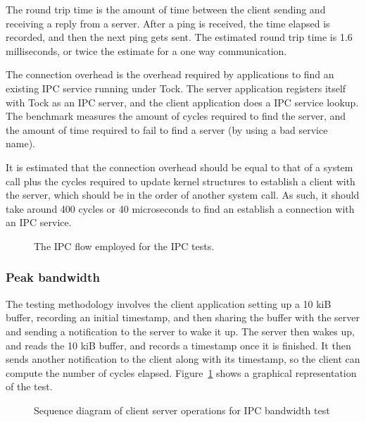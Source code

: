 \documentclass{article}
\begin{document}
The round trip time is the amount of time between the client sending and receiving a reply from a server. After a ping is received, the time elapsed is recorded, and then the next ping gets sent. The estimated round trip time is 1.6 milliseconds, or twice the estimate for a one way communication.

The connection overhead is the overhead required by applications to find an existing IPC service running under Tock. The server application registers itself with Tock as an IPC server, and the client application does a IPC service lookup. The benchmark measures the amount of cycles required to find the server, and the amount of time required to fail to find a server (by using a bad service name).

It is estimated that the connection overhead should be equal to that of a system call plus the cycles required to update kernel structures to establish a client with the server, which should be in the order of another system call. As such, it should take around 400 cycles or 40 microseconds to find an establish a connection with an IPC service.

\begin{figure}[htbp]
  \centering
  
  \caption{The IPC flow employed for the IPC tests.}
\end{figure}



\subsubsection{Peak bandwidth}

The testing methodology involves the client application setting up a 10 kiB buffer, recording an initial timestamp, and then sharing the buffer with the server and sending a notification to the server to wake it up. The server then wakes up, and reads the 10 kiB buffer, and records a timestamp once it is finished. It then sends another notification to the client along with its timestamp, so the client can compute the number of cycles elapsed. Figure~\ref{fig:ipc_bandwith} shows a graphical representation of the test.

\begin{figure}[htbp]
  \centering
  
  \caption{Sequence diagram of client server operations for IPC bandwidth test}
  \label{fig:ipc_bandwith}
\end{figure}
\end{document}
